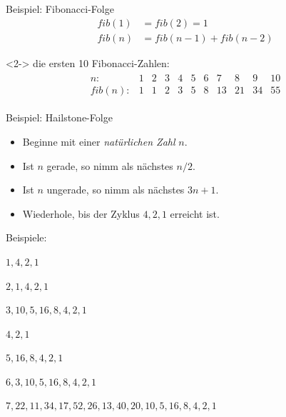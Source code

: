 \begin{frame}
    \begin{block}
    {Beispiel: Fibonacci-Folge}
    \begin{align*}
        fib(1) &= fib(2) = 1 \\
        fib(n) &= fib(n-1) + fib(n-2)
    \end{align*}
    \end{block}
    \begin{block}<2->
    {die ersten 10 Fibonacci-Zahlen:}
    \begin{align*}
        \begin{array}{r|r|r|r|r|r|r|r|r|r|r}
            n: & 1 & 2 & 3 & 4 & 5 & 6 & 7 & 8 & 9 & 10\\
            \hline
            fib(n): & 1 & 1 & 2 & 3 & 5 & 8 & 13 & 21 & 34 & 55
        \end{array}
    \end{align*}
    \end{block}
\end{frame}

\begin{frame}
    \begin{block}
    {Beispiel: Hailstone-Folge}
    \begin{itemize}
        \item Beginne mit einer \emph{natürlichen Zahl} $n$.
        \item Ist $n$ gerade, so nimm als nächstes $n/2$.
        \item Ist $n$ ungerade, so nimm als nächstes $3n+1$.
        \item Wiederhole, bis der Zyklus $4,2,1$ erreicht ist.
    \end{itemize}
    \end{block}
    \begin{block}
    {Beispiele:}
    \begin{description}
        \item<2->[$n = 1$:] $1,4,2,1$
        \item<3->[$n = 2$:] $2,1,4,2,1$
        \item<4->[$n = 3$:] $3,10,5,16,8,4,2,1$
        \item<5->[$n = 4$:] $4,2,1$
        \item<6->[$n = 5$:] $5,16,8,4,2,1$
        \item<7->[$n = 6$:] $6,3,10,5,16,8,4,2,1$
        \item<8->[$n = 7$:] $7,22,11,34,17,52,26,13,40,20,10,5,16,8,4,2,1$
    \end{description}
    \end{block}
\end{frame}

